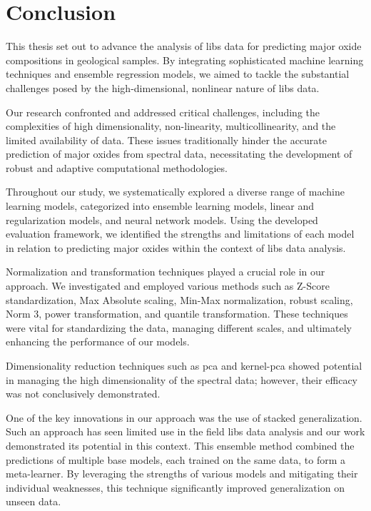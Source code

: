 \section{Conclusion}\label{sec:conclusion}
This thesis set out to advance the analysis of \gls{libs} data for predicting major oxide compositions in geological samples.
By integrating sophisticated machine learning techniques and ensemble regression models, we aimed to tackle the substantial challenges posed by the high-dimensional, nonlinear nature of \gls{libs} data.

Our research confronted and addressed critical challenges, including the complexities of high dimensionality, non-linearity, multicollinearity, and the limited availability of data.
These issues traditionally hinder the accurate prediction of major oxides from spectral data, necessitating the development of robust and adaptive computational methodologies.

Throughout our study, we systematically explored a diverse range of machine learning models, categorized into ensemble learning models, linear and regularization models, and neural network models.
Using the developed evaluation framework, we identified the strengths and limitations of each model in relation to predicting major oxides within the context of \gls{libs} data analysis.

Normalization and transformation techniques played a crucial role in our approach.
We investigated and employed various methods such as Z-Score standardization, Max Absolute scaling, Min-Max normalization, robust scaling, Norm 3, power transformation, and quantile transformation.
These techniques were vital for standardizing the data, managing different scales, and ultimately enhancing the performance of our models.

Dimensionality reduction techniques such as \gls{pca} and \gls{kernel-pca} showed potential in managing the high dimensionality of the spectral data; however, their efficacy was not conclusively demonstrated.

One of the key innovations in our approach was the use of stacked generalization.
Such an approach has seen limited use in the field \gls{libs} data analysis and our work demonstrated its potential in this context.
This ensemble method combined the predictions of multiple base models, each trained on the same data, to form a meta-learner.
By leveraging the strengths of various models and mitigating their individual weaknesses, this technique significantly improved generalization on unseen data.

